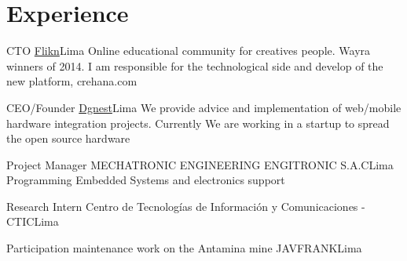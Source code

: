 \section{Experience}

{CTO}
{\href{http://www.flikn.com}{Flikn}}{Lima}
{Online educational community for creatives people. Wayra winners of 2014. I am responsible for the technological side and develop of the new platform, crehana.com}
{} 

{CEO/Founder}
{\href{http://dgnest.com}{Dgnest}}{Lima}
{We provide advice and implementation of web/mobile hardware integration projects. Currently We are working in a startup to spread the open source hardware}
{} 

{Project Manager}
{MECHATRONIC ENGINEERING ENGITRONIC S.A.C}{Lima}
{Programming Embedded Systems and electronics support}
{} 

{Research Intern}
{Centro de Tecnologías de Información y Comunicaciones - CTIC}{Lima}
{}
{} 

{Participation maintenance work on the Antamina mine}
{JAVFRANK}{Lima}
{}
{}  